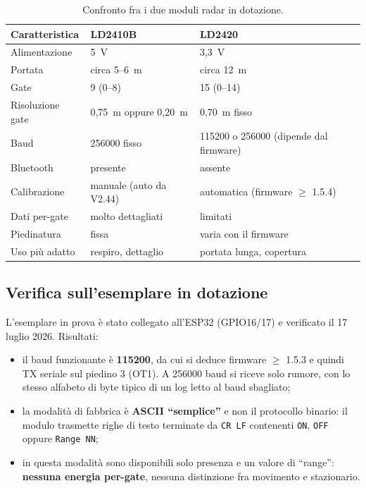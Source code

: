 \begin{table}[htbp]
\centering
\caption{Confronto fra i due moduli radar in dotazione.}
\label{tab:confronto-moduli}
\small
\begin{tabularx}{\textwidth}{@{}lXX@{}}
\toprule
\textbf{Caratteristica} & \textbf{LD2410B} & \textbf{LD2420} \\
\midrule
Alimentazione & 5~V & 3,3~V \\
Portata & circa 5--6~m & circa 12~m \\
Gate & 9 (0--8) & 15 (0--14) \\
Risoluzione gate & 0,75~m oppure 0,20~m & 0,70~m fisso \\
Baud & 256000 fisso & 115200 o 256000 (dipende dal firmware) \\
Bluetooth & presente & assente \\
Calibrazione & manuale (auto da V2.44) & automatica (firmware $\geq$ 1.5.4) \\
Dati per-gate & molto dettagliati & limitati \\
Piedinatura & fissa & varia con il firmware \\
Uso più adatto & respiro, dettaglio & portata lunga, copertura \\
\bottomrule
\end{tabularx}
\end{table}

\subsection{Verifica sull'esemplare in dotazione}

L'esemplare in prova è stato collegato all'ESP32 (GPIO16/17) e verificato il
17 luglio 2026. Risultati:

\begin{itemize}[leftmargin=1.4em,itemsep=2pt]
  \item il baud funzionante è \textbf{115200}, da cui si deduce firmware
        $\geq$ 1.5.3 e quindi TX seriale sul piedino 3 (OT1). A 256000 baud si
        riceve solo rumore, con lo stesso alfabeto di byte tipico di un log letto
        al baud sbagliato;
  \item la modalità di fabbrica è \textbf{ASCII ``semplice''} e non il protocollo
        binario: il modulo trasmette righe di testo terminate da
        \texttt{CR\,LF} contenenti \texttt{ON}, \texttt{OFF} oppure
        \texttt{Range NN};
  \item in questa modalità sono disponibili solo presenza e un valore di
        ``range'': \textbf{nessuna energia per-gate}, nessuna distinzione fra
        movimento e stazionario.
\end{itemize}

